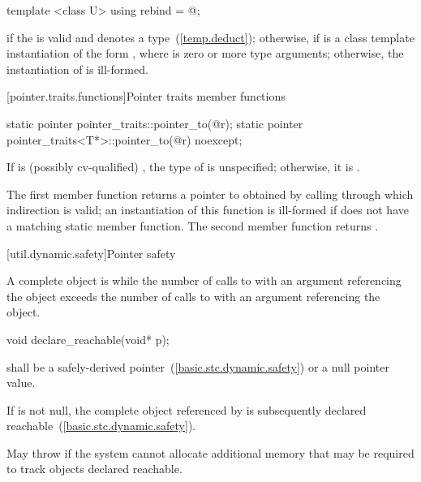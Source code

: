%
\begin{itemdecl}
template <class U> using rebind = @\seebelow@;
\end{itemdecl}

\begin{itemdescr}
\pnum
\templalias {} if
the   is valid and denotes a
type~(\ref{temp.deduct}); otherwise,
 if
 is a class template instantiation of the form ,
where  is zero or more type arguments; otherwise, the instantiation of
 is ill-formed.
\end{itemdescr}

[pointer.traits.functions]{Pointer traits member functions}

%
\begin{itemdecl}
static pointer pointer_traits::pointer_to(@\seebelow@ r);
static pointer pointer_traits<T*>::pointer_to(@\seebelow@ r) noexcept;
\end{itemdecl}

\begin{itemdescr}
\pnum
\remark If  is (possibly cv-qualified) , the type of
 is unspecified; otherwise, it is .

\pnum
\returns The first member function returns a pointer to 
obtained by calling  through which
indirection is valid; an instantiation of this function is
ill-formed if  does not have a matching  static member
function. The second member function returns .
\end{itemdescr}

[util.dynamic.safety]{Pointer safety}

\pnum
A complete object is  while the number of calls to
 with an argument referencing the object exceeds the
number of calls to  with an argument referencing the
object.

%
\begin{itemdecl}
void declare_reachable(void* p);
\end{itemdecl}

\begin{itemdescr}
\pnum
\requires {} shall be a safely-derived
pointer~(\ref{basic.stc.dynamic.safety}) or a null pointer value.

\pnum
\effects If  is not null, the complete object referenced by 
is subsequently declared reachable~(\ref{basic.stc.dynamic.safety}).

\pnum
\throws May throw  if the system cannot allocate
additional memory that may be required to track objects declared reachable.
\end{itemdescr}

